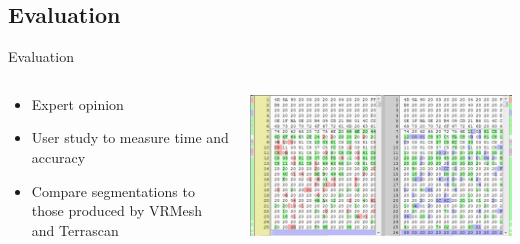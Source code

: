 \documentclass[compress]{beamer}
\begin{document}
\subsection{Evaluation}

\begin{frame}{Evaluation}
\begin{columns}[T]
\begin{column}{0.6\textwidth}
	\begin{itemize}
		\item Expert opinion
		\item User study to measure time and accuracy
		\item Compare segmentations to those produced by VRMesh and Terrascan
	\end{itemize}
	
\end{column}
\begin{column}{0.4\textwidth}
\includegraphics[width=1\textwidth]{pics/diff.png}
\end{column}
\end{columns}
\end{frame}
\end{document}
